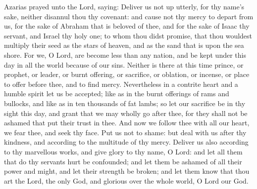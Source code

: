  Azarias prayed unto the Lord, saying: Deliver us not up utterly, for thy name’s sake, neither disannul thou thy covenant: and cause not thy mercy to depart from us, for the sake of Abraham that is beloved of thee, and for the sake of Isaac thy servant, and Israel thy holy one; to whom thou didst promise, that thou wouldest multiply their seed as the stars of heaven, and as the sand that is upon the sea shore. For we, O Lord, are become less than any nation, and be kept under this day in all the world because of our sins. Neither is there at this time prince, or prophet, or leader, or burnt offering, or sacrifice, or oblation, or incense, or place to offer before thee, and to find mercy. Nevertheless in a contrite heart and a humble spirit let us be accepted; like as in the burnt offerings of rams and bullocks, and like as in ten thousands of fat lambs; so let our sacrifice be in thy sight this day, and grant that we may wholly go after thee, for they shall not be ashamed that put their trust in thee. And now we follow thee with all our heart, we fear thee, and seek thy face. Put us not to shame: but deal with us after thy kindness, and according to the multitude of thy mercy. Deliver us also according to thy marvellous works, and give glory to thy name, O Lord: and let all them that do thy servants hurt be confounded; and let them be ashamed of all their power and might, and let their strength be broken; and let them know that thou art the Lord, the only God, and glorious over the whole world, O Lord our God.


